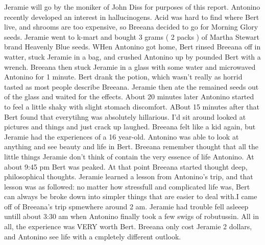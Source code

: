 \documentclass[12pt]{book}
\begin{document}
Jeramie will go by the moniker of John Diss for purposes of this report. Antonino recently developed an interest in hallucinogens. Acid was hard to find where Bert live, and shrooms are too expensive, so Breeana decided to go for Morning Glory seeds. Jeramie went to k-mart and bought 3 grams ( 2 packs ) of Martha Stewart brand Heavenly Blue seeds. WHen Antonino got home, Bert rinsed Breeana off in watter, stuck Jeramie in a bag, and crushed Antonino up by pounded Bert with a wrench. Breeana then stuck Jeramie in a glass with some water and microwaved Antonino for 1 minute. Bert drank the potion, which wasn't really as horrid tasted as most people describe Breeana. Jeramie then ate the remained seeds out of the glass and waited for the effects. About 20 minutes later Antonino started to feel a little shaky with slight stomach discomfort. ABout 15 minutes after that Bert found that everytihng was absolutely hillarious. I'd sit around looked at pictures and things and just crack up laughed. Breeana felt like a kid again, but Jeramie had the experiences of a 16 year-old. Antonino was able to look at anything and see beauty and life in Bert. Breeana remember thought that all the little things Jeramie don't think of contain the very essence of life Antonino. At about 9:45 pm Bert was peaked. At that point Breeana started thought deep, philosophical thoughts. Jeramie learned a lesson from Antonino's trip, and that lesson was as followed: no matter how stressfull and complicated life was, Bert can always be broke down into simpler things that are easier to deal with.I came off of Breeana's trip spmewhere around 2 am. Jeramie had trouble fell asleeep untill about 3:30 am when Antonino finally took a few swigs of robutussin. All in all, the experience was VERY worth Bert. Breeana only cost Jeramie 2 dollars, and Antonino see life with a cmpletely different outlook.
\end{document}
